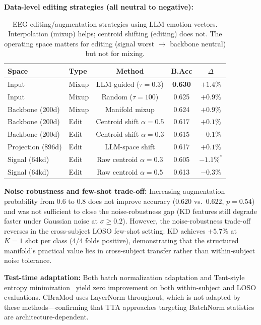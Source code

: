\noindent\textbf{Data-level editing strategies (all neutral to negative):}

\begin{table}[!h]
\caption{EEG editing/augmentation strategies using LLM emotion vectors. Interpolation (mixup) helps; centroid shifting (editing) does not. The operating space matters for editing (signal worst $\to$ backbone neutral) but not for mixing.}
\small
\centering
\begin{tabular}{llccc}
\toprule
Space & Type & Method & B.Acc & $\Delta$ \\
\midrule
Input & Mixup & LLM-guided ($\tau=0.3$) & \textbf{0.630} & $\mathbf{+1.4\%}$ \\
Input & Mixup & Random ($\tau=100$) & 0.625 & $+0.9\%$ \\
Backbone (200d) & Mixup & Manifold mixup & 0.624 & $+0.9\%$ \\
Backbone (200d) & Edit & Centroid shift $\alpha=0.5$ & 0.617 & $+0.1\%$ \\
Backbone (200d) & Edit & Centroid shift $\alpha=0.3$ & 0.615 & $-0.1\%$ \\
Projection (896d) & Edit & LLM-space shift & 0.617 & $+0.1\%$ \\
Signal (64kd) & Edit & Raw centroid $\alpha=0.3$ & 0.605 & $-1.1\%^{*}$ \\
Signal (64kd) & Edit & Raw centroid $\alpha=0.5$ & 0.613 & $-0.3\%$ \\
\bottomrule
\end{tabular}
\label{tab:supp_editing_strategies}
\end{table}

\noindent\textbf{Noise robustness and few-shot trade-off:} Increasing augmentation probability from $0.6$ to $0.8$ does not improve accuracy ($0.620$ vs.\ $0.622$, $p = 0.54$) and was not sufficient to close the noise-robustness gap (KD features still degrade faster under Gaussian noise at $\sigma \geq 0.2$). However, the noise-robustness trade-off reverses in the cross-subject LOSO few-shot setting: KD achieves $+5.7\%$ at $K = 1$ shot per class (4/4 folds positive), demonstrating that the structured manifold's practical value lies in cross-subject transfer rather than within-subject noise tolerance.

\noindent\textbf{Test-time adaptation:} Both batch normalization adaptation and Tent-style entropy minimization~\cite{neurottt2025} yield zero improvement on both within-subject and LOSO evaluations. CBraMod uses LayerNorm throughout, which is not adapted by these methods---confirming that TTA approaches targeting BatchNorm statistics are architecture-dependent.

